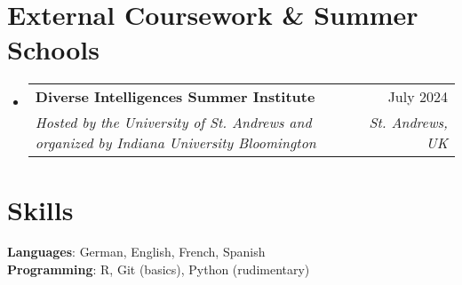 \documentclass[letterpaper,11pt]{article}
\makeatletter
\newcommand{\resumeSubheading}[4]{
  \vspace{1pt}\item
    \begin{tabular*}{0.97\textwidth}[t]{l@{\extracolsep{\fill}}r}
      \textbf{#1} & #2 \\
      \textit{\small#3} & \textit{\small #4} \\
    \end{tabular*}\vspace{-7pt}
}
\newcommand{\resumeSubHeadingListStart}{\begin{itemize}[leftmargin=0.15in, label={}]}
\newcommand{\resumeSubHeadingListEnd}{\end{itemize}}
\makeatother
\begin{document}
\section{External Coursework \& Summer Schools}
  \resumeSubHeadingListStart

    \resumeSubheading
      {Diverse Intelligences Summer Institute}{July 2024}
      {Hosted by the University of St. Andrews and organized by Indiana University Bloomington
}{St. Andrews, UK}

  \resumeSubHeadingListEnd

\section{Skills}
 \begin{itemize}[leftmargin=0.15in, label={}]
    \small{\item{
     \textbf{Languages}{: German, English, French, Spanish} \\
     \textbf{Programming}{: R, Git (basics), Python (rudimentary)} \\
    }}
 \end{itemize}

\end{document}
